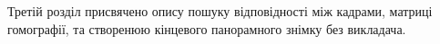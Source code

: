 Третій розділ присвячено опису пошуку відповідності між кадрами,
матриці гомографії, та створенюю кінцевого панорамного
знімку без викладача.